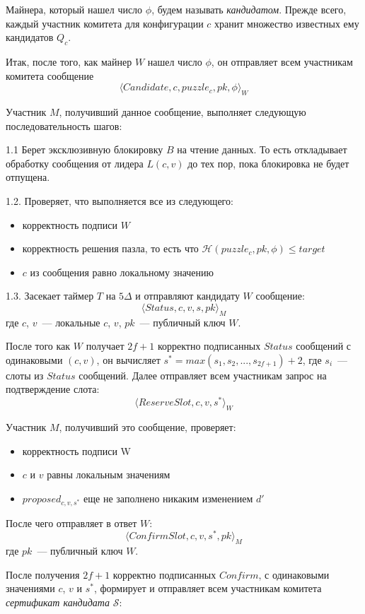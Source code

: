 Майнера, который нашел число $\phi$, будем называть \textit{кандидатом}.
Прежде всего, каждый участник комитета для конфигурации $c$ хранит множество известных ему кандидатов $Q_c$.
\vspace{10pt}

Итак, после того, как майнер $W$ нашел число $\phi$, он отправляет всем участникам комитета сообщение
 \[ \langle Candidate, c, puzzle_c, pk, \phi \rangle_W \]
 
Участник $M$, получивший данное сообщение, выполняет следующую последовательность шагов:

1.1 Берет эксклюзивную блокировку $B$ на чтение данных. То есть откладывает обработку сообщения от лидера $L(c, v)$ до тех пор, пока блокировка не будет отпущена. 

1.2. Проверяет, что выполняется все из следующего:
\begin{itemize}
\item корректность подписи $W$ 
\item корректность решения пазла, то есть что $\mathcal{H}(puzzle_c, pk, \phi) \le target$
\item $c$ из сообщения равно локальному значению
\end{itemize}

1.3. Засекает таймер $T$ на $5\Delta$ и отправляют кандидату $W$ сообщение:
 \[ \langle Status, c, v, s, pk \rangle_M \]
где $c$, $v$~--- локальные  $c$, $v$, $pk$~--- публичный ключ $W$.
\vspace{10pt}

После того как $W$ получает $2f+1$ корректно подписанных $Status$ сообщений с одинаковыми $(c, v)$, он вычисляет $s^{*}=max(s_1, s_2,..., s_{2f+1})+2$, где $s_i$~--- слоты из $Status$ сообщений.
Далее отправляет всем участникам запрос на подтверждение слота:
 \[ \langle ReserveSlot, c, v, s^{*} \rangle_W \]
 
\noindent Участник $M$, получивший это сообщение, проверяет:
\begin{itemize}
\item корректность подписи W
\item $c$ и $v$ равны локальным значениям
\item $proposed_{c, v, s^{*}}$ еще не заполнено никаким изменением $d'$
\end{itemize} 
После чего отправляет в ответ $W$:
 \[ \langle ConfirmSlot, c, v, s^{*}, pk \rangle_M \]
где $pk$~--- публичный ключ $W$.
\vspace{10pt}

После получения $2f+1$ корректно подписанных $Confirm$, с одинаковыми значениями $c$, $v$ и $s^{*}$,
формирует и отправляет всем участникам комитета \textit{сертификат кандидата} $\mathcal{S}$:

